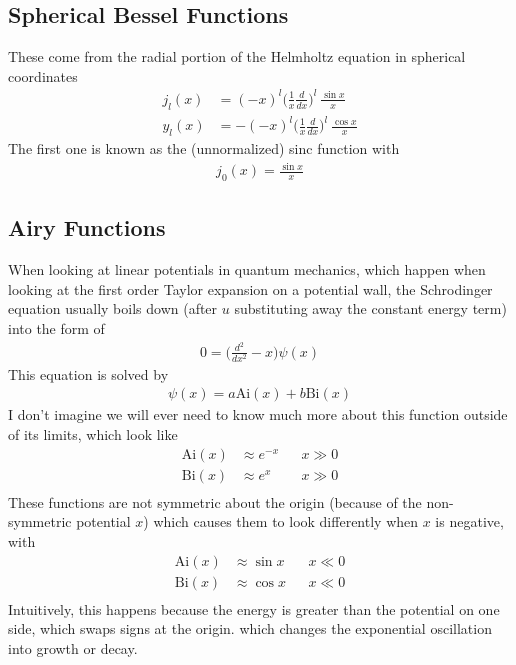 \subsection{Spherical Bessel Functions}
These come from the radial portion of the Helmholtz equation in spherical coordinates
\begin{align}
j_l(x) &= (-x)^l \Big(\frac{1}{x}\frac{d}{dx}\Big)^l~\frac{\sin x}{x}\\
y_l(x) &= -(-x)^l\Big(\frac{1}{x}\frac{d}{dx}\Big)^l~\frac{\cos x}{x}
\end{align}
The first one is known as the (unnormalized) sinc function with
\begin{align}
j_0(x) = \frac{\sin x}{x}
\end{align}

\subsection{Airy Functions}
When looking at linear potentials in quantum mechanics, which happen when looking at the first order Taylor expansion on a potential wall, the Schrodinger equation usually boils down (after $u$ substituting away the constant energy term) into the form of
\begin{align}
0 = \Big(\frac{d^2}{dx^2} - x\Big) \psi(x)
\end{align}
This equation is solved by
\begin{align}
\psi(x) = a\textrm{Ai}(x) + b\textrm{Bi}(x)
\end{align}
I don't imagine we will ever need to know much more about this function outside of its limits, which look like
\begin{align}
\textrm{Ai}(x) &\approx e^{-x} && x\gg 0\\
\textrm{Bi}(x) &\approx e^{x} && x\gg 0\\
\end{align}
These functions are not symmetric about the origin (because of the non-symmetric potential $x$) which causes them to look differently when $x$ is negative, with
\begin{align}
\textrm{Ai}(x) &\approx \sin x && x\ll 0\\
\textrm{Bi}(x) &\approx \cos x && x\ll 0\\
\end{align}
Intuitively, this happens because the energy is greater than the potential on one side, which swaps signs at the origin. which changes the exponential oscillation into growth or decay.


